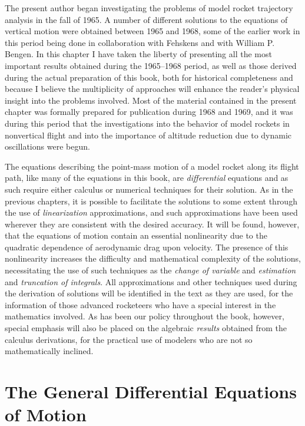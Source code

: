 The present author began investigating the problems of model rocket trajectory analysis in the
fall of 1965. A number of different solutions to the equations of vertical motion were obtained
between 1965 and 1968, some of the earlier work in this period being done in collaboration with
Fehskens and with William P. Bengen. In this chapter I have taken the liberty of presenting all the
most important results obtained during the 1965--1968 period, as well as those derived during the
actual preparation of this book, both for historical completeness and because I believe the
multiplicity of approaches will enhance the reader's physical insight into the problems involved.
Most of the material contained in the present chapter was formally prepared for publication during
1968 and 1969, and it was during this period that the investigations into the behavior of model
rockets in nonvertical flight and into the importance of altitude reduction due to dynamic
oscillations were begun.

The equations describing the point-mass motion of a model rocket along its flight path, like many
of the equations in this book, are \emph{differential} equations and as such require either
calculus or numerical techniques for their solution. As in the previous chapters, it is possible to
facilitate the solutions to some extent through the use of \emph{linearization} approximations,
and such approximations have been used wherever they are consistent with the desired accuracy. It
will be found, however, that the equations of motion contain an essential nonlinearity due to the
quadratic dependence of aerodynamic drag upon velocity. The presence of this nonlinearity increases
the difficulty and mathematical complexity of the solutions, necessitating the use of such
techniques as the \emph{change of variable} and \emph{estimation} and \emph{truncation of
integrals}. All approximations and other techniques used during the derivation of solutions will
be identified in the text as they are used, for the information of those advanced rocketeers who
have a special interest in the mathematics involved. As has been our policy throughout the book,
however, special emphasis will also be placed on the algebraic \emph{results} obtained from the
calculus derivations, for the practical use of modelers who are not so mathematically inclined.

\section{The General Differential Equations of Motion}\label{ch4:sec:1}

